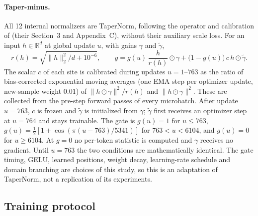 \documentclass[11pt]{article}
\begin{document}
\paragraph{Taper-minus.} All 12 internal normalizers are TaperNorm, following the operator and calibration of
\citet{kanavalau2026tapernorm} (their Section~3 and Appendix~C), without their auxiliary scale loss. For an input
$h \in \mathbb{R}^d$ at global update $u$, with gains $\gamma$ and $\tilde\gamma$,
\begin{equation}
  r(h) = \sqrt{\lVert h\rVert_2^2/d + 10^{-6}}, \qquad
  y = g(u)\, \frac{h}{r(h)} \odot \gamma + \big(1 - g(u)\big)\, c\, h \odot \tilde\gamma .
\end{equation}
The scalar $c$ of each site is calibrated during updates $u = 1$--$763$ as the ratio of bias-corrected
exponential moving averages (one EMA step per optimizer update, new-sample weight $0.01$) of
$\lVert h\odot\gamma\rVert^2 / r(h)$ and $\lVert h\odot\gamma\rVert^2$. These are collected from the pre-step
forward passes of every microbatch. After update $u = 763$, $c$ is frozen and $\tilde\gamma$ is initialized from
$\gamma$; $\tilde\gamma$ first receives an optimizer step at $u = 764$ and stays trainable. The gate is $g(u) = 1$
for $u \le 763$, $g(u) = \tfrac12[1 + \cos(\pi (u - 763)/5341)]$ for $763 < u < 6104$, and $g(u) = 0$ for
$u \ge 6104$. At $g = 0$ no per-token statistic is computed and $\gamma$ receives no gradient. Until $u = 763$ the
two conditions are mathematically identical. The gate timing, GELU, learned positions, weight decay,
learning-rate schedule and domain branching are choices of this study, so this is an adaptation of TaperNorm, not
a replication of its experiments.

\subsection{Training protocol}
\end{document}
